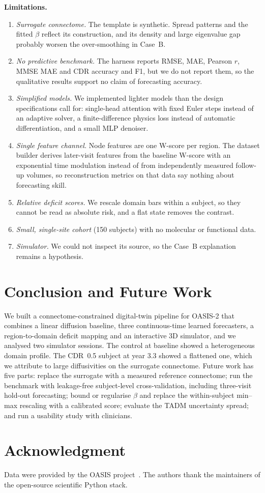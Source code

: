 \documentclass[conference]{IEEEtran}
\begin{document}
\textbf{Limitations.}
\begin{enumerate}
\item \emph{Surrogate connectome.} The template is synthetic. Spread patterns and the fitted $\beta$ reflect its construction, and its density and large eigenvalue gap probably worsen the over-smoothing in Case~B.
\item \emph{No predictive benchmark.} The harness reports RMSE, MAE, Pearson $r$, MMSE MAE and CDR accuracy and F1, but we do not report them, so the qualitative results support no claim of forecasting accuracy.
\item \emph{Simplified models.} We implemented lighter models than the design specifications call for: single-head attention with fixed Euler steps instead of an adaptive solver, a finite-difference physics loss instead of automatic differentiation, and a small MLP denoiser.
\item \emph{Single feature channel.} Node features are one W-score per region. The dataset builder derives later-visit features from the baseline W-score with an exponential time modulation instead of from independently measured follow-up volumes, so reconstruction metrics on that data say nothing about forecasting skill.
\item \emph{Relative deficit scores.} We rescale domain bars within a subject, so they cannot be read as absolute risk, and a flat state removes the contrast.
\item \emph{Small, single-site cohort} (150 subjects) with no molecular or functional data.
\item \emph{Simulator.} We could not inspect its source, so the Case~B explanation remains a hypothesis.
\end{enumerate}

\section{Conclusion and Future Work}
We built a connectome-constrained digital-twin pipeline for OASIS-2 that combines a linear diffusion baseline, three continuous-time learned forecasters, a region-to-domain deficit mapping and an interactive 3D simulator, and we analysed two simulator sessions. The control at baseline showed a heterogeneous domain profile. The CDR~0.5 subject at year 3.3 showed a flattened one, which we attribute to large diffusivities on the surrogate connectome. Future work has five parts: replace the surrogate with a measured reference connectome; run the benchmark with leakage-free subject-level cross-validation, including three-visit hold-out forecasting; bound or regularise $\beta$ and replace the within-subject min--max rescaling with a calibrated score; evaluate the TADM uncertainty spread; and run a usability study with clinicians.

\section*{Acknowledgment}
Data were provided by the OASIS project~\cite{marcus2010oasis}. The authors thank the maintainers of the open-source scientific Python stack.



\end{document}
